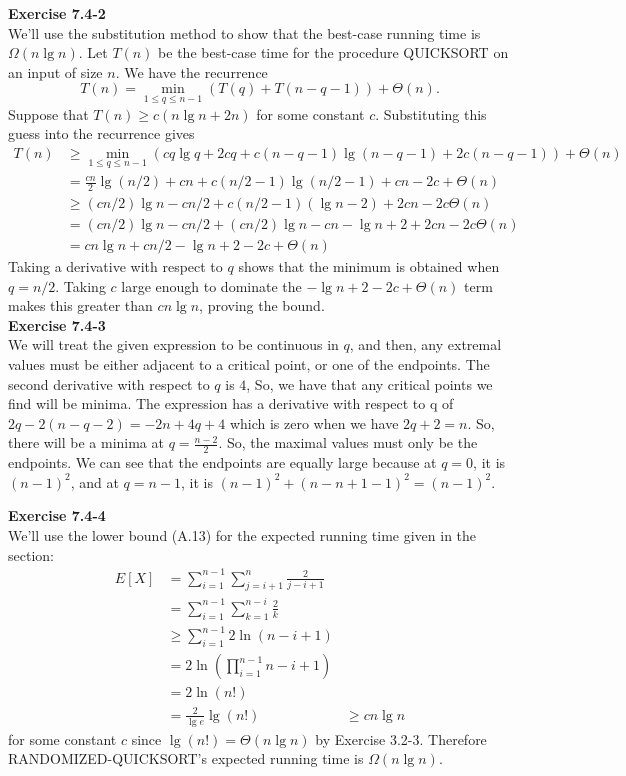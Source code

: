 \documentclass{article}
\begin{document}
\noindent\textbf{Exercise 7.4-2}\\

We'll use the substitution method to show that the best-case running time is $\Omega(n \lg n)$.  Let $T(n)$ be the best-case time for the procedure QUICKSORT on an input of size $n$.  We have the recurrence
\[ T(n) = \min_{1 \leq q \leq n-1} (T(q) + T(n-q-1)) + \Theta(n).\]
Suppose that $T(n) \geq c(n\lg n + 2n)$ for some constant $c$.  Substituting this guess into the recurrence gives
\begin{align*}
T(n) &\geq \min_{1 \leq q \leq n-1} (cq\lg q + 2cq + c(n-q-1)\lg(n-q-1) + 2c(n-q-1)) + \Theta(n) \\
&= \frac{cn}{2}\lg(n/2) + cn + c(n/2 - 1)\lg(n/2 - 1) + cn - 2c+ \Theta(n) \\
&\geq (cn/2)\lg n - cn/2 + c(n/2 - 1)(\lg n - 2) + 2cn - 2c \Theta(n) \\
&= (cn/2)\lg n - cn/2 + (cn/2)\lg n - cn - \lg n + 2 + 2cn - 2c\Theta(n) \\
&=cn\lg n + cn/2 - \lg n + 2 - 2c + \Theta(n)
\end{align*}
Taking a derivative with respect to $q$ shows that the minimum is obtained when $q = n/2$.  Taking $c$ large enough to dominate the $-\lg n + 2 - 2c + \Theta(n)$ term makes this greater than $cn\lg n$, proving the bound. \\

\noindent\textbf{Exercise 7.4-3}\\

We will treat the given expression to be continuous in $q$, and then, any extremal values must be either adjacent to a critical point, or one of the endpoints. The second derivative with respect to $q$ is $4$, So, we have that any critical points we find will be minima. The expression has a derivative with respect to q of $2q - 2 (n-q-2) = -2n + 4q +4$ which is zero when we have $2q+2 =n$. So, there will be a minima at $q= \frac{n-2}{2}$. So, the maximal values must only be the endpoints. We can see that the endpoints are equally large because at $q=0$, it is $(n-1)^2$, and at $q=n-1$, it is $(n-1)^2+ (n-n+1 -1)^2 = (n-1)^2$.


\noindent\textbf{Exercise 7.4-4}\\

We'll use the lower bound (A.13) for the expected running time given in the section:
\begin{align*}
E[X] &= \sum_{i=1}^{n-1}\sum_{j=i+1}^n \frac{2}{j-i+1} \\
&= \sum_{i=1}^{n-1} \sum_{k=1}^{n-i} \frac{2}{k} \\
&\geq \sum_{i=1}^{n-1} 2\ln(n-i+1) \\
&= 2\ln\left(\prod_{i=1}^{n-1} n-i+1\right) \\
&= 2\ln(n!) \\
&= \frac{2}{\lg e} \lg(n!)
&\geq cn \lg n
\end{align*}
for some constant $c$ since $\lg(n!) = \Theta(n \lg n)$ by Exercise 3.2-3. Therefore RANDOMIZED-QUICKSORT's expected running time is $\Omega(n \lg n)$. \\
\end{document}
